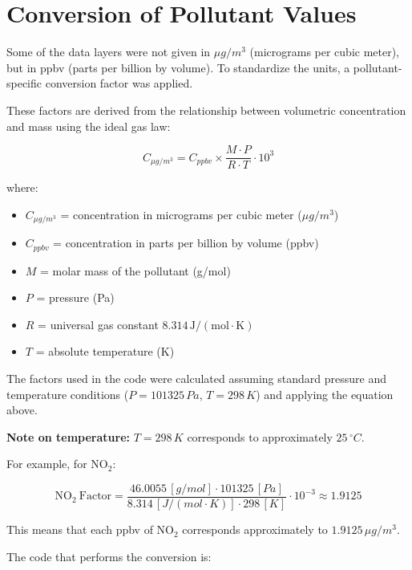 \section{Conversion of Pollutant Values}

Some of the data layers were not given in \(\mu g/m^3\) (micrograms per cubic meter), but in ppbv (parts per billion by volume).  
To standardize the units, a pollutant-specific conversion factor was applied.  

These factors are derived from the relationship between volumetric concentration and mass using the ideal gas law:

\[
C_{\mu g/m^3} = C_{ppbv} \times \frac{M \cdot P}{R \cdot T} \cdot 10^3
\]

where:
\begin{itemize}
	\item \(C_{\mu g/m^3}\) = concentration in micrograms per cubic meter (\(\mu g/m^3\))  
	\item \(C_{ppbv}\) = concentration in parts per billion by volume (ppbv)  
	\item \(M\) = molar mass of the pollutant (g/mol)  
	\item \(P\) = pressure (Pa)  
	\item \(R\) = universal gas constant \(8.314\,\mathrm{J/(mol\cdot K)}\)  
	\item \(T\) = absolute temperature (K)  
\end{itemize}

The factors used in the code were calculated assuming standard pressure and temperature conditions (\(P = 101325\,Pa\), \(T = 298\,K\)) and applying the equation above.  

\textbf{Note on temperature:} \(T = 298\,K\) corresponds to approximately \(25\,^\circ C\).


For example, for \(\mathrm{NO_2}\):

\[
\mathrm{NO_2\ Factor} = \frac{46.0055\,[g/mol] \cdot 101325\,[Pa]}{8.314\,[J/(mol\cdot K)] \cdot 298\,[K]} \cdot 10^{-3} \approx 1.9125
\]

This means that each ppbv of NO\(_2\) corresponds approximately to \(1.9125\,\mu g/m^3\).  

The code that performs the conversion is:

